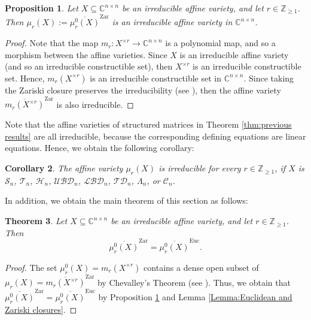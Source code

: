 \documentclass[reqno]{amsart}
\newtheorem{theorem}{Theorem}[section]
\newtheorem{proposition}[theorem]{Proposition}
\newtheorem{corollary}[theorem]{Corollary}
\theoremstyle{definition}
\newcommand{\C}{\mathbb{C}}
\newcommand{\Z}{\mathbb{Z}}
\numberwithin{equation}{section}
\begin{document}
\begin{proposition}\label{prop:irreducibility}
    Let $X \subseteq \C^{n \times n}$ be an irreducible affine variety, and let $r \in \Z_{\geq 1}$. Then $\mu_r(X):=\overline{\mu_r^0(X)}^{\text{Zar}}$ is an irreducible affine variety in $\C^{n \times n}$.
\end{proposition}
\begin{proof}
Note that the map $m_r:X^{\times r} \rightarrow \mathbb{C}^{n \times n}$ is a polynomial map, and so a morphism between the affine varieties. Since $X$ is an irreducible affine variety (and so an irreducible constructible set), then $X^{\times r}$ is an irreducible constructible set. Hence, $m_r(X^{\times r})$ is an irreducible constructible set in $\C^{n \times n}$. Since taking the Zariski closure preserves the irreducibility (see \cite[Example 1.1.4]{hartshorne2013algebraic}), then the affine variety $\overline{m_r(X^{\times r})}^{\text{Zar}}$ is also irreducible.
\end{proof}

Note that the affine varieties of structured matrices in Theorem \ref{thm:previous results} are all irreducible, because the corresponding defining equations are linear equations. Hence, we obtain the following corollary:

\begin{corollary}
    The affine variety $\mu_r(X)$ is irreducible for every $r \in \mathbb{Z}_{\geq 1}$, if $X$ is $\mathcal{S}_n$, $\mathcal{T}_n$, $\mathcal{H}_n$, $\mathcal{UBD}_n$, $\mathcal{LBD}_n$, $\mathcal{TD}_n$, $\Lambda_n$, or $\mathcal{C}_n$.
\end{corollary}

In addition, we obtain the main theorem of this section as follows:

\begin{theorem}\label{thm:Zariski vs. Euclidean closures}
    Let $X \subseteq \C^{n \times n}$ be an irreducible affine variety, and let $r \in \Z_{\geq 1}$. Then
    \begin{equation*}
    \overline{\mu_r^0(X)}^{\text{Zar}}=\overline{\mu_r^0(X)}^{\text{Euc}}.
\end{equation*}
\end{theorem}
\begin{proof}
    The set $\mu_r^0(X)=m_r(X^{\times r})$ contains a dense open subset of $\mu_r(X)=\overline{m_r(X^{\times r})}^{\text{Zar}}$ by Chevalley's Theorem (see {\cite[Corollary AG.10.2]{borel2012linear}}). Thus, we obtain that $\overline{\mu_r^0(X)}^{\text{Zar}}=\overline{\mu_r^0(X)}^{\text{Euc}}$ by Proposition \ref{prop:irreducibility} and Lemma \ref{Lemma:Euclidean and Zariski closures}.
\end{proof}
\end{document}
